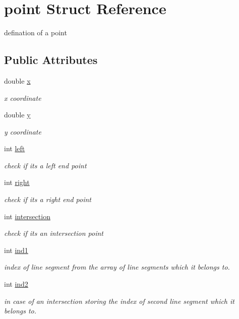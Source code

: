 \hypertarget{structpoint}{}\section{point Struct Reference}
\label{structpoint}


defination of a point  


\subsection*{Public Attributes}
\begin{DoxyCompactItemize}
\item 
double \hyperlink{structpoint_a9c6b34deaf4900ad4193c17935fd384a}{x}
\begin{DoxyCompactList}\small\item\em x coordinate \end{DoxyCompactList}\item 
double \hyperlink{structpoint_a613f8f0d7352731638b0094e1b958b87}{y}
\begin{DoxyCompactList}\small\item\em y coordinate \end{DoxyCompactList}\item 
int \hyperlink{structpoint_a713fc74a985eeee5f844c324c8d03bfc}{left}
\begin{DoxyCompactList}\small\item\em check if it\textquotesingle{}s a left end point \end{DoxyCompactList}\item 
int \hyperlink{structpoint_adbab7dd5bb4d8cbec245104f550f0607}{right}
\begin{DoxyCompactList}\small\item\em check if it\textquotesingle{}s a right end point \end{DoxyCompactList}\item 
int \hyperlink{structpoint_a510e9106f982be555012f6fdd6b52af4}{intersection}
\begin{DoxyCompactList}\small\item\em check if it\textquotesingle{}s an intersection point \end{DoxyCompactList}\item 
int \hyperlink{structpoint_afe9fd442f02a824cfdd08d51368ad006}{ind1}
\begin{DoxyCompactList}\small\item\em index of line segment from the array of line segments which it belongs to. \end{DoxyCompactList}\item 
int \hyperlink{structpoint_ae3ae8dac2b4b5e7b9e05cbf370e43cac}{ind2}
\begin{DoxyCompactList}\small\item\em in case of an intersection storing the index of second line segment which it belongs to. \end{DoxyCompactList}\end{DoxyCompactItemize}


